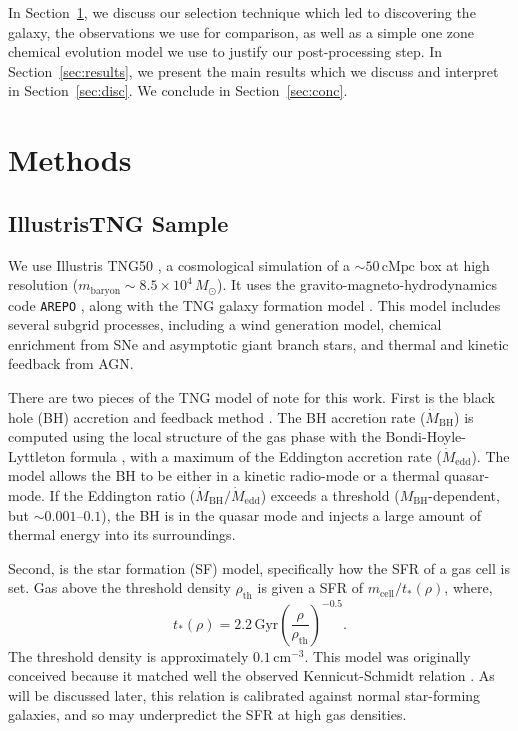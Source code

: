 \documentclass[twocolumn,linenumbers]{aastex631}
\newcommand{\Msun}{\ensuremath{M_{\odot}}}
\newcommand{\Gyr}{\ensuremath{\textrm{Gyr}}}
\begin{document}
In Section~\ref{sec:methods}, we discuss our selection technique which led to discovering the galaxy, the observations we use for comparison, as well as a simple one zone chemical evolution model we use to justify our post-processing step. In Section~\ref{sec:results}, we present the main results which we discuss and interpret in Section~\ref{sec:disc}. We conclude in Section~\ref{sec:conc}.

\section{Methods}\label{sec:methods}
\subsection{IllustrisTNG Sample}\label{ssec:tng}
We use Illustris TNG50 \citep{2019MNRAS.490.3196P, 2019MNRAS.490.3234N, 2019ComAC...6....2N}, a cosmological simulation of a $\sim50\,\textrm{cMpc}$ box at high resolution ($m_{\textrm{baryon}}\sim8.5\times10^4\,\Msun$). It uses the gravito-magneto-hydrodynamics code \texttt{AREPO} \citep{2010MNRAS.401..791S, 2016MNRAS.455.1134P}, along with the TNG galaxy formation model \citep{2013MNRAS.436.3031V, 2017MNRAS.465.3291W, 2018MNRAS.473.4077P}. This model includes several subgrid processes, including a wind generation model, chemical enrichment from SNe and asymptotic giant branch stars, and thermal and kinetic feedback from AGN.

There are two pieces of the TNG model of note for this work. First is the black hole (BH) accretion and feedback method \citep{2017MNRAS.465.3291W}. The BH accretion rate ($\dot{M}_{\textrm{BH}}$) is computed using the local structure of the gas phase with the Bondi-Hoyle-Lyttleton formula \citep{1939PCPS...35..405H,1944MNRAS.104..273B,1952MNRAS.112..195B}, with a maximum of the Eddington accretion rate ($\dot{M}_{\textrm{edd}}$). The model allows the BH to be either in a kinetic radio-mode or a thermal quasar-mode. If the Eddington ratio ($\dot{M}_{\textrm{BH}}/\dot{M}_{\textrm{edd}}$) exceeds a threshold ($M_{\textrm{BH}}$-dependent, but $\sim0.001$--$0.1$), the BH is in the quasar mode and injects a large amount of thermal energy into its surroundings.

Second, is the star formation (SF) model, specifically how the SFR of a gas cell is set. Gas above the threshold density $\rho_{\textrm{th}}$ is given a SFR of $m_{\textrm{cell}}/t_{*}(\rho)$, where,
\begin{equation*}
t_{*}(\rho)=2.2\,\Gyr \left(\frac{\rho}{\rho_{\textrm{th}}}\right)^{-0.5}\textrm{.}
\end{equation*}
The threshold density is approximately $0.1\,\textrm{cm}^{-3}$. This model was originally conceived because it matched well the observed Kennicut-Schmidt relation \citep{Kennicutt1998,2003MNRAS.339..289S}. As will be discussed later, this relation is calibrated against normal star-forming galaxies, and so may underpredict the SFR at high gas densities.
\end{document}
